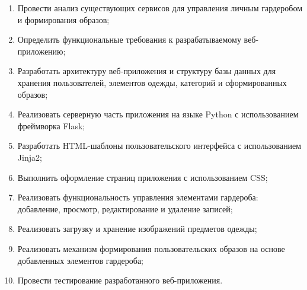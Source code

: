 \begin{enumerate}
	\item Провести анализ существующих сервисов для управления личным гардеробом и формирования образов;
	\item Определить функциональные требования к разрабатываемому веб-приложению;
	\item Разработать архитектуру веб-приложения и структуру базы данных для хранения пользователей, элементов одежды, категорий и сформированных образов;
	\item Реализовать серверную часть приложения на языке Python с использованием фреймворка Flask;
	\item Разработать HTML-шаблоны пользовательского интерфейса с использованием Jinja2;
	\item Выполнить оформление страниц приложения с использованием CSS;
	\item Реализовать функциональность управления элементами гардероба: добавление, просмотр, редактирование и удаление записей;
	\item Реализовать загрузку и хранение изображений предметов одежды;
	\item Реализовать механизм формирования пользовательских образов на основе добавленных элементов гардероба;
	\item Провести тестирование разработанного веб-приложения.
    
\end{enumerate}
